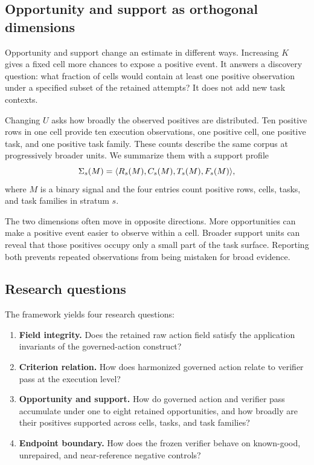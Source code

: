 \subsection{Opportunity and support as orthogonal dimensions}

Opportunity and support change an estimate in different ways. Increasing $K$ gives a fixed cell more chances to expose a positive event. It answers a discovery question: what fraction of cells would contain at least one positive observation under a specified subset of the retained attempts? It does not add new task contexts.

Changing $U$ asks how broadly the observed positives are distributed. Ten positive rows in one cell provide ten execution observations, one positive cell, one positive task, and one positive task family. These counts describe the same corpus at progressively broader units. We summarize them with a support profile
\begin{equation}
\Sigma_s(M)=\langle R_s(M),C_s(M),T_s(M),F_s(M)\rangle,
\label{eq:support-profile}
\end{equation}
where $M$ is a binary signal and the four entries count positive rows, cells, tasks, and task families in stratum $s$.

The two dimensions often move in opposite directions. More opportunities can make a positive event easier to observe within a cell. Broader support units can reveal that those positives occupy only a small part of the task surface. Reporting both prevents repeated observations from being mistaken for broad evidence.

\subsection{Research questions}

The framework yields four research questions:
\begin{enumerate}[label=\textbf{RQ\arabic*:},leftmargin=*,itemsep=0.35em]
    \item \textbf{Field integrity.} Does the retained raw action field satisfy the application invariants of the governed-action construct?
    \item \textbf{Criterion relation.} How does harmonized governed action relate to verifier pass at the execution level?
    \item \textbf{Opportunity and support.} How do governed action and verifier pass accumulate under one to eight retained opportunities, and how broadly are their positives supported across cells, tasks, and task families?
    \item \textbf{Endpoint boundary.} How does the frozen verifier behave on known-good, unrepaired, and near-reference negative controls?
\end{enumerate}
